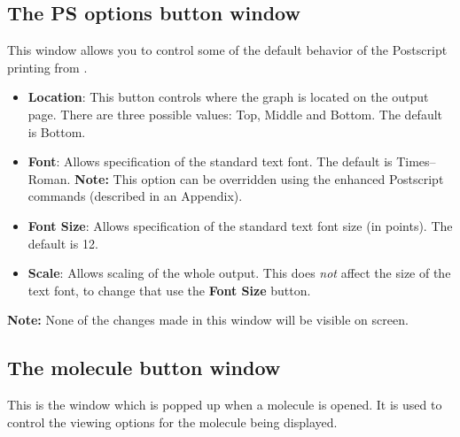 \subsection{The PS options button window}

This window allows you to control some of the default behavior of the
Postscript printing from \viewprog.  

\begin{itemize}
\item {\bf Location}:  This button controls where the graph is located
on the output page.  There are three possible values: Top, Middle and
Bottom.  The default is Bottom.

\item {\bf Font}: Allows specification of the standard text font.  The
default is Times--Roman.  {\bf Note:}  This option can be overridden
using the enhanced Postscript commands (described in an Appendix).

\item {\bf Font Size}: Allows specification of the standard text font
size (in points).  The default is 12.

\item {\bf Scale}: Allows scaling of the whole output.  This does {\em
not} affect the size of the text font, to change that use the {\bf Font
Size} button.

\end{itemize}

{\bf Note:} None of the changes
made in this window will be visible on screen.


\subsection{The molecule button window}

This is the window which is popped up when a molecule is opened.  It
is used to control the viewing options for the molecule being
displayed.  

